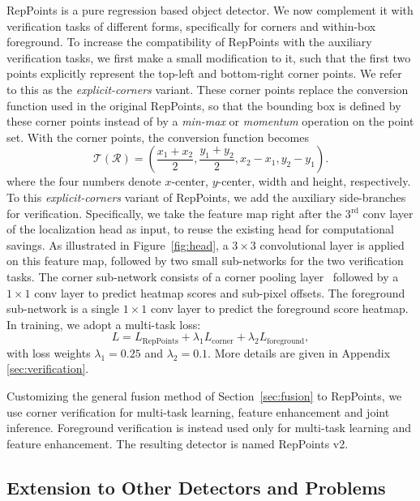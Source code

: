 \documentclass{article}
\begin{document}
RepPoints is a pure regression based object detector. We now complement it with verification tasks of different forms, specifically for corners and within-box foreground. To increase the compatibility of RepPoints with the auxiliary verification tasks, we first make a small modification to it, such that the first two points explicitly represent the top-left and bottom-right corner points. We refer to this as the {\em explicit-corners} variant. These corner points replace the conversion function used in the original RepPoints, so that the bounding box is defined by these corner points instead of by a \textit{min-max} or \textit{momentum} operation on the point set. With the corner points, the conversion function becomes
\begin{equation}
    \mathcal{T}(\mathcal{R}) = \left(\frac{x_1+x_2}{2}, \frac{y_1+y_2}{2}, x_2-x_1, y_2-y_1\right).
\end{equation}
where the four numbers denote $x$-center, $y$-center, width and height, respectively. To this {\em explicit-corners} variant of RepPoints, we add the auxiliary side-branches for verification. Specifically, we
take the feature map right after the 3$^\text{rd}$ conv layer of the localization head as input, to reuse the existing head for computational savings. As illustrated in Figure~\ref{fig:head}, a $3\times 3$ convolutional layer is applied on this feature map, followed by two small sub-networks for the two verification tasks. The corner sub-network consists of a corner pooling layer~\cite{CornerNet} followed by a $1\times1$ conv layer to predict heatmap scores and sub-pixel offsets. The foreground sub-network is a single $1\times 1$ conv layer to predict the foreground score heatmap. In training, we adopt a multi-task loss:
\begin{equation}
    L = L_\text{RepPoints} + \lambda_1 L_\text{corner} + \lambda_2 L_\text{foreground},
\end{equation}
with loss weights $\lambda_1=0.25$ and $\lambda_2=0.1$. More details are given in Appendix \ref{sec:verification}.

Customizing the general fusion method of Section~\ref{sec:fusion} to RepPoints, we use corner verification for multi-task learning, feature enhancement and joint inference. Foreground verification is instead used only for multi-task learning and feature enhancement. The resulting detector is named RepPoints v2.

\subsection{Extension to Other Detectors and Problems}
\end{document}
